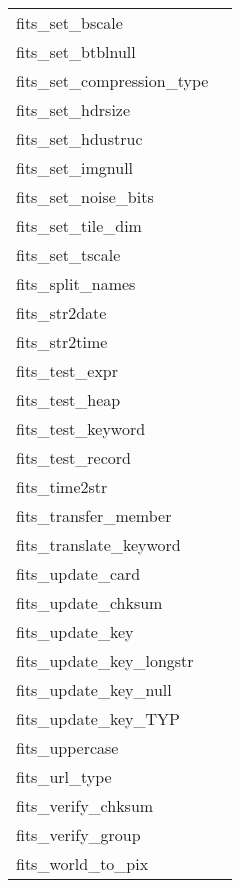 \documentclass[11pt]{book}
\begin{document}
\begin{tabular}{lr}
fits\_set\_bscale     & \pageref{ffpscl} \\
fits\_set\_btblnull   & \pageref{fftnul} \\
fits\_set\_compression\_type  & \pageref{ffsetcomp} \\
fits\_set\_hdrsize    & \pageref{ffhdef} \\
fits\_set\_hdustruc   & \pageref{ffrdef} \\
fits\_set\_imgnull    & \pageref{ffpnul} \\
fits\_set\_noise\_bits  & \pageref{ffsetcomp} \\
fits\_set\_tile\_dim  & \pageref{ffsetcomp} \\
fits\_set\_tscale     & \pageref{fftscl} \\
fits\_split\_names    & \pageref{splitnames} \\
fits\_str2date        & \pageref{ffdt2s} \\
fits\_str2time        & \pageref{ffdt2s} \\
fits\_test\_expr      & \pageref{fftexp} \\
fits\_test\_heap      & \pageref{fftheap} \\
fits\_test\_keyword   & \pageref{fftkey} \\
fits\_test\_record    & \pageref{fftrec} \\
fits\_time2str  & \pageref{ffdt2s} \\
fits\_transfer\_member  & \pageref{ffgmtf} \\
fits\_translate\_keyword & \pageref{translatekey} \\
fits\_update\_card       & \pageref{ffucrd} \\
fits\_update\_chksum  & \pageref{ffupck} \\
fits\_update\_key        & \pageref{ffuky} \\
fits\_update\_key\_longstr   & \pageref{ffukyx} \\
fits\_update\_key\_null   & \pageref{ffukyu} \\
fits\_update\_key\_TYP    & \pageref{ffukyx} \\
fits\_uppercase      & \pageref{ffupch} \\
fits\_url\_type      & \pageref{ffurlt} \\
fits\_verify\_chksum  & \pageref{ffvcks} \\
fits\_verify\_group  & \pageref{ffgtvf} \\
fits\_world\_to\_pix & \pageref{ffxypx} \\

\end{tabular}
\end{document}
